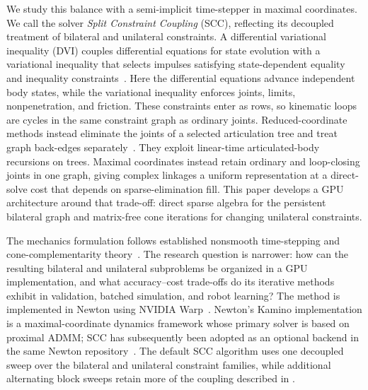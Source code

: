 \documentclass{article}
\theoremstyle{plain}
\theoremstyle{definition}
\begin{document}
We study this balance with a semi-implicit time-stepper in maximal coordinates.
We call the solver \emph{Split Constraint Coupling} (SCC), reflecting its
decoupled treatment of bilateral and unilateral constraints.
A differential variational inequality (DVI) couples differential
equations for state evolution with a variational inequality that selects
impulses satisfying state-dependent equality and inequality
constraints~\cite{pang2008dvi}. Here the differential equations advance
independent body states, while the variational inequality enforces joints,
limits, nonpenetration, and friction. These constraints enter as rows, so
kinematic loops are
cycles in the same constraint graph as ordinary joints. Reduced-coordinate
methods instead eliminate the joints of a selected articulation tree and treat
graph back-edges separately~\cite{featherstone2008}. They exploit linear-time
articulated-body recursions on trees. Maximal coordinates instead retain
ordinary and loop-closing joints in one graph, giving complex linkages a uniform
representation at a direct-solve cost that depends on sparse-elimination fill.
This paper develops a GPU architecture around that trade-off:
direct sparse algebra for the persistent bilateral graph and matrix-free cone
iterations for changing unilateral constraints.

The mechanics formulation follows established nonsmooth time-stepping and
cone-complementarity theory~\cite{stewart1996,anitescu2006,tasora2011}. The
research question is narrower: how can the resulting bilateral and unilateral
subproblems be organized in a GPU implementation, and what accuracy--cost
trade-offs do its iterative methods exhibit in validation, batched simulation,
and robot learning? The method is implemented in Newton using NVIDIA
Warp~\cite{warp2022}. Newton's
Kamino implementation is a maximal-coordinate dynamics framework whose primary
solver is based on proximal ADMM; SCC has subsequently been adopted as an
optional backend in the same Newton repository~\cite{tsounis2026kamino,newton2025}. The default
SCC algorithm uses one decoupled sweep over the bilateral and unilateral
constraint families, while additional alternating block sweeps retain more of
the coupling described in .
\end{document}
